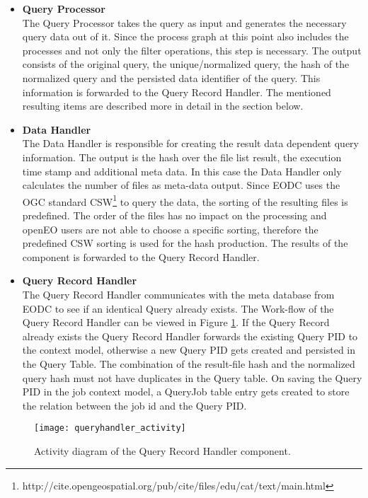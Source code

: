 \documentclass[draft,final]{vutinfth} %
\begin{document}
 \begin{itemize}
	\item \textbf{Query Processor} \\
	The Query Processor takes the query as input and generates the necessary query data out of it. Since the process graph at this point also includes the processes and not only the filter operations, this step is necessary. The output consists of the original query, the unique/normalized query, the hash of the normalized query and the persisted data identifier of the query. This information is forwarded to the Query Record Handler. The mentioned resulting items are described more in detail in the section below.  
	\item \textbf{Data Handler} \\ 
	The Data Handler is responsible for creating the result data dependent query information. The output is the hash over the file list result, the execution time stamp and additional meta data. In this case the Data Handler only calculates the number of files as meta-data output. Since EODC uses the OGC standard CSW\footnote{http://cite.opengeospatial.org/pub/cite/files/edu/cat/text/main.html} to query the data, the sorting of the resulting files is predefined. The order of the files has no impact on the processing and openEO users are not able to choose a specific sorting, therefore the predefined CSW sorting is used for the hash production. The results of the component is forwarded to the Query Record Handler.    
	\item \textbf{Query Record Handler} \\
	The Query Record Handler communicates with the meta database from EODC to see if an identical Query already exists. The Work-flow of the Query Record Handler can be viewed in Figure \ref{fig:queryhandler_activity}. If the Query Record already exists the Query Record Handler forwards the existing Query PID to the context model, otherwise a new Query PID gets created and persisted in the Query Table. The combination of the result-file hash and the normalized query hash must not have duplicates in the Query table. On saving the Query PID in the job context model, a QueryJob table entry gets created to store the relation between the job id and the Query PID. 
	
\end{itemize}

\begin{figure}[h]
	\centering
	\texttt{[image: queryhandler\_activity]}
	\caption{Activity diagram of the Query Record Handler component.}
	\label{fig:queryhandler_activity} %
\end{figure}
\end{document}
